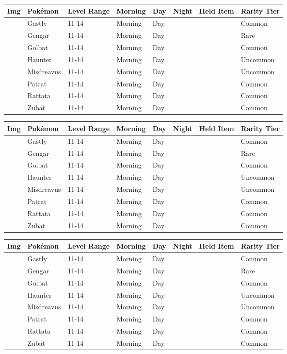 \begin{longtable}{||l l l l l l l l||}%
\hline%
Img&Pokémon&Level Range&Morning&Day&Night&Held Item&Rarity Tier\\%
\hline%
\endhead%
\hline%
&Gastly&11{-}14&Morning&Day&&&Common\\%
\hline%
&Gengar&11{-}14&Morning&Day&&&Rare\\%
\hline%
&Golbat&11{-}14&Morning&Day&&&Common\\%
\hline%
&Haunter&11{-}14&Morning&Day&&&Uncommon\\%
\hline%
&Misdreavus&11{-}14&Morning&Day&&&Uncommon\\%
\hline%
&Patrat&11{-}14&Morning&Day&&&Common\\%
\hline%
&Rattata&11{-}14&Morning&Day&&&Common\\%
\hline%
&Zubat&11{-}14&Morning&Day&&&Common\\%
\hline%
\end{longtable}%
\begin{longtable}{||l l l l l l l l||}%
\hline%
Img&Pokémon&Level Range&Morning&Day&Night&Held Item&Rarity Tier\\%
\hline%
\endhead%
\hline%
&Gastly&11{-}14&Morning&Day&&&Common\\%
\hline%
&Gengar&11{-}14&Morning&Day&&&Rare\\%
\hline%
&Golbat&11{-}14&Morning&Day&&&Common\\%
\hline%
&Haunter&11{-}14&Morning&Day&&&Uncommon\\%
\hline%
&Misdreavus&11{-}14&Morning&Day&&&Uncommon\\%
\hline%
&Patrat&11{-}14&Morning&Day&&&Common\\%
\hline%
&Rattata&11{-}14&Morning&Day&&&Common\\%
\hline%
&Zubat&11{-}14&Morning&Day&&&Common\\%
\hline%
\end{longtable}%
\begin{longtable}{||l l l l l l l l||}%
\hline%
Img&Pokémon&Level Range&Morning&Day&Night&Held Item&Rarity Tier\\%
\hline%
\endhead%
\hline%
&Gastly&11{-}14&Morning&Day&&&Common\\%
\hline%
&Gengar&11{-}14&Morning&Day&&&Rare\\%
\hline%
&Golbat&11{-}14&Morning&Day&&&Common\\%
\hline%
&Haunter&11{-}14&Morning&Day&&&Uncommon\\%
\hline%
&Misdreavus&11{-}14&Morning&Day&&&Uncommon\\%
\hline%
&Patrat&11{-}14&Morning&Day&&&Common\\%
\hline%
&Rattata&11{-}14&Morning&Day&&&Common\\%
\hline%
&Zubat&11{-}14&Morning&Day&&&Common\\%
\hline%
\end{longtable}%
